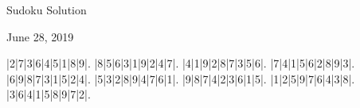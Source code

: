 \documentclass{article}
\begin{document}
\begin{center}
\Huge{Sudoku Solution}
\end{center}
\begin{center}
\Large{June 28, 2019}
\end{center}
\begin{sudoku}
|2|7|3|6|4|5|1|8|9|.
|8|5|6|3|1|9|2|4|7|.
|4|1|9|2|8|7|3|5|6|.
|7|4|1|5|6|2|8|9|3|.
|6|9|8|7|3|1|5|2|4|.
|5|3|2|8|9|4|7|6|1|.
|9|8|7|4|2|3|6|1|5|.
|1|2|5|9|7|6|4|3|8|.
|3|6|4|1|5|8|9|7|2|.
\end{sudoku}
\end{document}
